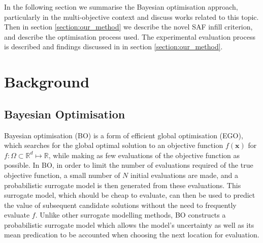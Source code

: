 \documentclass[conference]{IEEEtran}
\newcommand{\ninitialevaluations}{N}
\newcommand{\parameterspace}{\Omega}
\newcommand{\ndim}{d}
\begin{document}
In the following section we summarise the Bayesian optimisation approach, particularly in the multi-objective context and discuss works related to this topic.  Then in section \ref{section:our_method} we describe the novel SAF infill criterion, and describe the optimisation process used.  The experimental evaluation process is described and findings discussed in in section \ref{section:our_method}.


\section{Background}
\subsection{Bayesian Optimisation}\label{section:background_BayesianOptimisation}
Bayesian optimisation (BO) is a form of efficient global optimisation (EGO), which searches for the global optimal solution to an objective function $f(\mathbf{x})$ for  $f: \parameterspace \subset \mathbb{R}^{\ndim} \mapsto \mathbb{R}$, while making as few evaluations of the objective function as possible. In BO, in order to limit the number of evaluations required of the true objective function,  a small number of $\ninitialevaluations$ initial evaluations are made, and a probabilistic surrogate model is then generated from these evaluations. This surrogate model, which should be cheap to evaluate, can then be used to predict the value of subsequent candidate solutions without the need to frequently evaluate $f$.   Unlike other surrogate modelling methods, BO constructs a probabilistic surrogate model which allows the model's uncertainty as well as its mean predication to be accounted when choosing the next location for evaluation.
\end{document}
